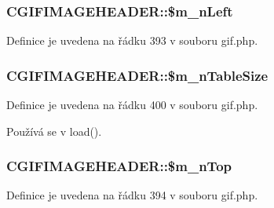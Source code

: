 \hypertarget{class_c_g_i_f_i_m_a_g_e_h_e_a_d_e_r_ac2e5fb60ea2d46594c818c5e507aa58f}{
\subsubsection[{\$m\-\_\-n\-Left}]{\setlength{\rightskip}{0pt plus 5cm}C\-G\-I\-F\-I\-M\-A\-G\-E\-H\-E\-A\-D\-E\-R\-::\$m\-\_\-n\-Left}}\label{class_c_g_i_f_i_m_a_g_e_h_e_a_d_e_r_ac2e5fb60ea2d46594c818c5e507aa58f}


Definice je uvedena na řádku 393 v souboru gif.\-php.

\hypertarget{class_c_g_i_f_i_m_a_g_e_h_e_a_d_e_r_ae5f06300d37055e834eb0a2a157beaa8}{
\subsubsection[{\$m\-\_\-n\-Table\-Size}]{\setlength{\rightskip}{0pt plus 5cm}C\-G\-I\-F\-I\-M\-A\-G\-E\-H\-E\-A\-D\-E\-R\-::\$m\-\_\-n\-Table\-Size}}\label{class_c_g_i_f_i_m_a_g_e_h_e_a_d_e_r_ae5f06300d37055e834eb0a2a157beaa8}


Definice je uvedena na řádku 400 v souboru gif.\-php.



Používá se v load().

\hypertarget{class_c_g_i_f_i_m_a_g_e_h_e_a_d_e_r_a65eb5b6d36ba1b7b2f781bc58918992c}{
\subsubsection[{\$m\-\_\-n\-Top}]{\setlength{\rightskip}{0pt plus 5cm}C\-G\-I\-F\-I\-M\-A\-G\-E\-H\-E\-A\-D\-E\-R\-::\$m\-\_\-n\-Top}}\label{class_c_g_i_f_i_m_a_g_e_h_e_a_d_e_r_a65eb5b6d36ba1b7b2f781bc58918992c}


Definice je uvedena na řádku 394 v souboru gif.\-php.


